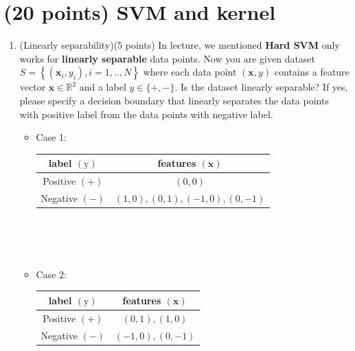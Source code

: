 \documentclass[12pt]{article}%
\begin{document}
\section{(20 points) SVM and kernel}
\begin{enumerate}
    \item (Linearly separability)(5 points) In lecture, we mentioned \textbf{Hard SVM} only works for \textbf{linearly separable} data points. Now you are given dataset $S=\left\{\left(\mathbf{x}_{i}, y_{i}\right), i=1, . ., N\right\}$ where each data point $(\mathbf{x}, y)$ contains a feature vector $\mathbf{x} \in \mathbb{R}^{2}$ and a label $y \in\{+,-\}$. Is the dataset linearly separable? If yes, please specify a decision boundary that linearly separates the data points with positive label from the data points with negative label.
    \begin{itemize}
        \item Case 1:\\
        \begin{table}[h]
            \centering
            \begin{tabular}{|c|c|}
                \hline label $(\mathrm{y})$ & features $(\mathbf{x})$ \\
                \hline Positive $(+)$ & $(0,0)$ \\
                \hline Negative $(-)$ & $(1,0),(0,1),(-1,0),(0,-1)$ \\
                \hline
            \end{tabular}
        \end{table}
        \\
        \\
        \\
        \item Case 2:\\
        \begin{table}[h]
            \centering
            \begin{tabular}{|c|c|}
                \hline label $(\mathrm{y})$ & features $(\mathbf{x})$ \\
                \hline Positive $(+)$ & $(0,1),(1,0)$ \\
                \hline Negative $(-)$ & $(-1,0),(0,-1)$ \\
                \hline
            \end{tabular}
        \end{table}
    \end{itemize}
    \newpage

\end{enumerate}
\end{document}
